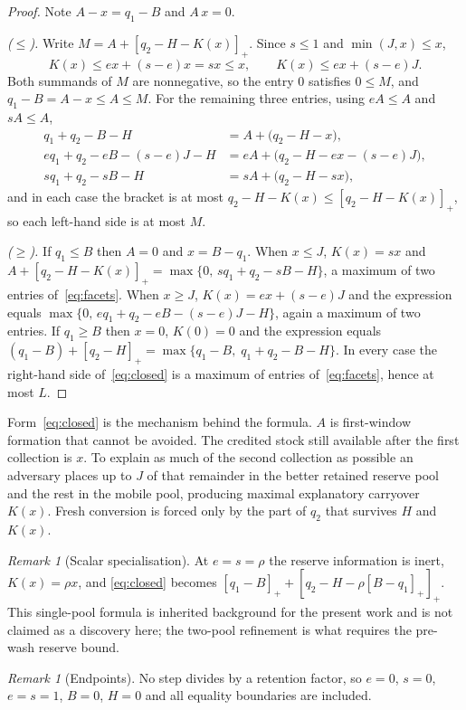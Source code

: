 \documentclass[11pt]{article}
\theoremstyle{plain}
\theoremstyle{definition}
\theoremstyle{remark}
\newtheorem{remark}[theorem]{Remark}
\newcommand{\pos}[1]{\left[#1\right]_{+}}
\newcommand{\Lc}{L}
\begin{document}
\begin{proof}
Note $A-x=q_1-B$ and $A\,x=0$.

\emph{($\le$).} Write $M=A+\pos{q_2-H-K(x)}$. Since $s\le1$ and
$\min(J,x)\le x$,
\[
 K(x)\le e x+(s-e)x=sx\le x,
 \qquad
 K(x)\le ex+(s-e)J .
\]
Both summands of $M$ are nonnegative, so the entry $0$ satisfies $0\le M$, and
$q_1-B=A-x\le A\le M$. For the remaining three entries, using $eA\le A$ and
$sA\le A$,
\begin{align*}
 q_1+q_2-B-H &= A+\bigl(q_2-H-x\bigr), \\
 e q_1+q_2-eB-(s-e)J-H &= eA+\bigl(q_2-H-ex-(s-e)J\bigr), \\
 s q_1+q_2-sB-H &= sA+\bigl(q_2-H-sx\bigr),
\end{align*}
and in each case the bracket is at most $q_2-H-K(x)\le\pos{q_2-H-K(x)}$, so
each left-hand side is at most $M$.

\emph{($\ge$).} If $q_1\le B$ then $A=0$ and $x=B-q_1$. When $x\le J$,
$K(x)=sx$ and $A+\pos{q_2-H-K(x)}=\max\{0,\,s q_1+q_2-sB-H\}$, a maximum of
two entries of~\eqref{eq:facets}. When $x\ge J$, $K(x)=ex+(s-e)J$ and the
expression equals $\max\{0,\,e q_1+q_2-eB-(s-e)J-H\}$, again a maximum of two
entries. If $q_1\ge B$ then $x=0$, $K(0)=0$ and the expression equals
$(q_1-B)+\pos{q_2-H}=\max\{q_1-B,\;q_1+q_2-B-H\}$.
In every case the right-hand side of~\eqref{eq:closed} is a maximum of entries
of~\eqref{eq:facets}, hence at most $\Lc$.
\end{proof}

Form~\eqref{eq:closed} is the mechanism behind the formula. $A$ is
first-window formation that cannot be avoided. The credited stock still
available after the first collection is $x$. To explain as much of the second
collection as possible an adversary places up to $J$ of that remainder in the
better retained reserve pool and the rest in the mobile pool, producing
maximal explanatory carryover $K(x)$. Fresh conversion is forced only by the
part of $q_2$ that survives $H$ and $K(x)$.

\begin{remark}[Scalar specialisation]
At $e=s=\rho$ the reserve information is inert, $K(x)=\rho x$, and
\eqref{eq:closed} becomes $\pos{q_1-B}+\pos{q_2-H-\rho\pos{B-q_1}}$. This
single-pool formula is inherited background for the present work and is not
claimed as a discovery here; the two-pool refinement is what requires the
pre-wash reserve bound.
\end{remark}

\begin{remark}[Endpoints]
No step divides by a retention factor, so $e=0$, $s=0$, $e=s=1$, $B=0$, $H=0$
and all equality boundaries are included.
\end{remark}
\end{document}

